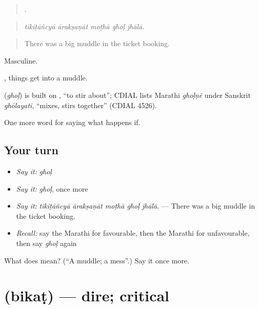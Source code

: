 \begin{quote}
    .
\end{quote}

\begin{quote}
\emph{tikiṭāñcyā ārakṣaṇāt moṭhā ghoḷ jhālā.}
\end{quote}

\begin{quote}
There was a big muddle in the ticket booking.
\end{quote}

Masculine.

 , things get into a muddle.

\begin{cousinweb}
\textbf{} (\emph{ghoḷ}) is built on , \textquotedblleft{}to stir about\textquotedblright{}; CDIAL lists Marathi \emph{ghoḷṇẽ} under Sanskrit \emph{ghōlayati}, \textquotedblleft{}mixes, stirs together\textquotedblright{} (CDIAL 4526).
\end{cousinweb}

\begin{grammarlens}[title={What you've built}]
One more word for saying what happens if.
\end{grammarlens}

\subsection*{Your turn}
\begin{itemize}
\raggedright
  \item \emph{Say it:} \emph{ghoḷ}
  \item \emph{Say it:} \emph{ghoḷ}, once more
  \item \emph{Say it:} \emph{tikiṭāñcyā ārakṣaṇāt moṭhā ghoḷ jhālā.} — There was a big muddle in the ticket booking.
  \item \emph{Recall:} say the Marathi for favourable, then the Marathi for unfavourable, then say \emph{ghoḷ} again
\end{itemize}

\begin{tcolorbox}[breakable,colback=teal!4,colframe=teal!35!black,title={Before you move on}]
What does  mean? (\textquotedblleft{}A muddle; a mess\textquotedblright{}.) Say it once more.
\end{tcolorbox}
\section[\texorpdfstring{\mr{बिकट} (bikaṭ)}{बिकट (bikaṭ)}]{ (bikaṭ) — dire; critical}

